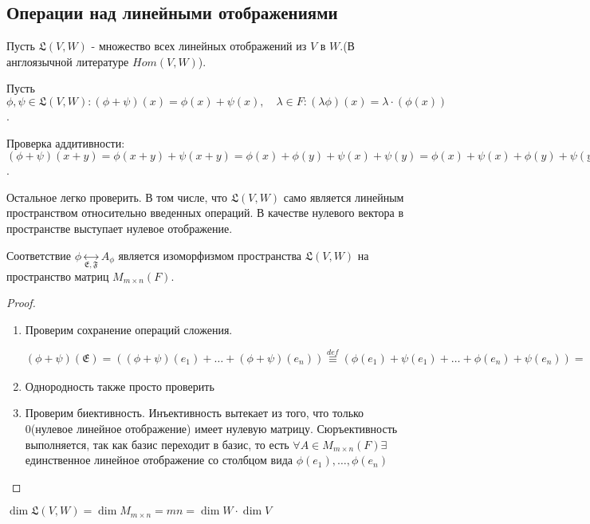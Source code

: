 \subsection{Операции над линейными отображениями}
Пусть $\mathfrak{L}(V, W)$ - множество всех линейных отображений из \(V\) в \(W\).(В англоязычной литературе \(Hom(V, W)\)). 

Пусть \(\phi, \psi\in \mathfrak{L}(V, W): (\phi+\psi)(x) = \phi(x) + \psi(x), \quad \lambda\in F: (\lambda \phi)(x) = \lambda\cdot(\phi(x))\). 

Проверка аддитивности: \((\phi+\psi)(x+y) = \phi(x+y)+\psi(x+y) = \phi(x)+\phi(y) + \psi(x) + \psi(y) = \phi(x) + \psi(x) + \phi(y) + \psi(y) = (\phi + \psi)(x) + (\phi + \psi)(y)\).

Остальное легко проверить. В том числе, что \(\mathfrak{L}(V, W)\) само является линейным пространством относительно введенных операций.
В качестве нулевого вектора в пространстве выступает нулевое отображение.
\begin{proposition}
	Соответствие $\phi\underset{\mathfrak{E}, \mathfrak{F}}{\longleftrightarrow} A_\phi$ является изоморфизмом пространства  \(\mathfrak{L}(V, W)\) на пространство матриц \(M_{m\times n}(F)\).
\end{proposition}
\begin{proof}
	\begin{enumerate}
		\item Проверим сохранение операций сложения. 
		
		\((\phi + \psi)(\mathfrak{E}) = ((\phi+\psi)(e_1)+\ldots + (\phi+\psi)(e_n))\overset{def}{\equiv} (\phi(e_1)+\psi(e_1)+\ldots + \phi(e_n)+\psi(e_n)) = (\phi(e_1) + \ldots + \phi(e_n)+(\psi(e_1)+\ldots + \psi(e_n))) = \mathfrak{F}\cdot A_\phi + \mathfrak{F}\cdot A_\phi = \mathfrak{F}(A_\phi + A_\psi) \)
		\item Однородность также просто проверить
		\item Проверим биективность. Инъективность вытекает из того, что только 0(нулевое линейное отображение) имеет нулевую матрицу. Сюръективность выполняется, так как базис переходит в базис, то есть \(\forall A\in M_{m\times n}(F) \exists\) единственное линейное отображение со столбцом вида \(\phi(e_1), \ldots, \phi(e_n)\)
	\end{enumerate}
\end{proof}
\begin{corollary}
	\(\dim \mathfrak{L}(V, W) = \dim M_{m\times n} = mn = \dim W\cdot\dim V\)
\end{corollary}


